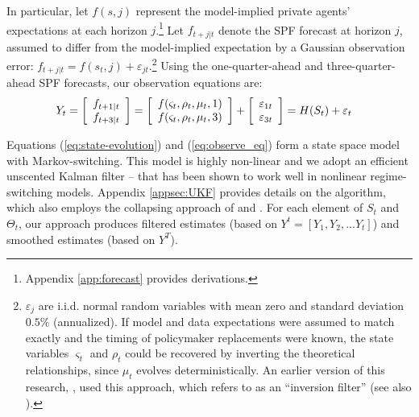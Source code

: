 \documentclass[12pt,letter,leqno]{article}
\theoremstyle{asn}
\theoremstyle{lem}
\theoremstyle{slem}
\theoremstyle{prop}
\theoremstyle{appprop}
\theoremstyle{rem}
\theoremstyle{defn}
\begin{document}
In particular, let $f(s, j)$ represent the model-implied private agents’ expectations at each horizon $j$.\footnote{Appendix \ref{app:forecast} provides derivations.} Let $f_{t+j|t}$ denote the SPF forecast at horizon $j$, assumed to differ from the model-implied expectation by a Gaussian observation error: $f_{t+j|t}=f(s_t,j)+\varepsilon_{jt}$.\footnote{$\varepsilon_{j}$ are i.i.d. normal random variables with mean zero and standard deviation $0.5\%$ (annualized). If model and data expectations were assumed to match exactly and the timing of policymaker replacements were known, the state variables $\varsigma_t$ and $\rho_t$ could be recovered by inverting the theoretical relationships, since $\mu_t$ evolves deterministically. An earlier version of this research, \cite{king_evolving_2022}, used this approach, which \cite{kollmann_tractable_2017} refers to as an “inversion filter” (see also \cite{drautzburg_filtering_2022}).} Using the one-quarter-ahead and three-quarter-ahead SPF forecasts, our observation equations are:
\begin{align}\label{eq:observe_eq}
Y_{t}&=\left[
\begin{array}
[c]{c}%
f_{t+1|t}\\
f_{t+3|t}\\
\end{array}
\right]  =\left[
\begin{array}
[c]{c}%
f(\varsigma_{t},\rho_{t},\mu_{t},1)\\
f(\varsigma_{t},\rho_{t},\mu_{t},3)\\
\end{array}
\right]  +\left[
\begin{array}
[c]{c}%
\varepsilon_{1t}\\
\varepsilon_{3t}\\
\end{array}
\right] =H(S_{t}) + \varepsilon_{t}
\end{align}

Equations (\ref{eq:state-evolution}) and (\ref{eq:observe_eq}) form a state space model with Markov-switching. This model is highly non-linear and we adopt an efficient unscented Kalman filter -- that has been shown to work well in nonlinear regime-switching models. Appendix \ref{appsec:UKF} provides details on the algorithm, which also employs the collapsing approach of \cite{kim_dynamic_1994} and \cite{kim_state-space_2017}. 
For each element of $S_{t}$ and $\Theta_{t}$, our approach produces filtered estimates (based on $Y^{t}=[Y_{1},Y_{2},...Y_{t}]$) and smoothed estimates (based on $Y^T$).
\end{document}
